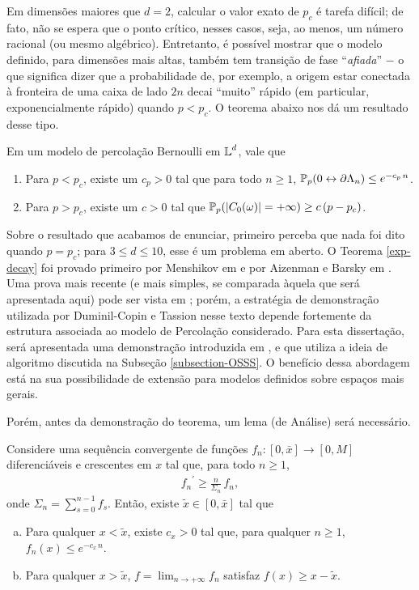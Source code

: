 Em dimensões maiores que $d = 2$, calcular o valor exato de $p_c$ é tarefa difícil; de fato, não se espera que o ponto crítico, nesses casos, seja, ao menos, um número racional (ou mesmo algébrico). Entretanto, é possível mostrar que o modelo definido, para dimensões mais altas, também tem transição de fase ``\textit{afiada}'' $-$ o que significa dizer que a probabilidade de, por exemplo, a origem estar conectada à fronteira de uma caixa de lado $2n$ decai ``muito'' rápido (em particular, exponencialmente rápido) quando $p < p_c$. O teorema abaixo nos dá um resultado desse tipo.

\begin{mythm} \label{exp-decay}
	Em um modelo de percolação Bernoulli em $\operatorname{\mathbb{L}}^d$, vale que
	\begin{enumerate}
		\item Para $p < p_c$, existe um $c_p > 0$ tal que para todo $n \geq 1$, $\operatorname{\mathbb{P}}_p(0 \leftrightarrow \partial\Lambda_n) \leq e^{-c_p\,n}$.
		\item Para $p > p_c$, existe um $c > 0$ tal que $\operatorname{\mathbb{P}}_p(|C_0(\omega)| = +\infty) \geq c\,(p - p_c)$.
	\end{enumerate}
\end{mythm}

Sobre o resultado que acabamos de enunciar, primeiro perceba que nada foi dito quando $p = p_c$; para $3 \leq d \leq 10$, esse é um problema em aberto. O Teorema \ref{exp-decay} foi provado primeiro por Menshikov em \cite{menshikov1986coincidence} e por Aizenman e Barsky em \cite{aizenman1987sharpness}. Uma prova mais recente (e mais simples, se comparada àquela que será apresentada aqui) pode ser vista em \cite{duminil2016newzd}; porém, a estratégia de demonstração utilizada por Duminil-Copin e Tassion nesse texto depende fortemente da estrutura associada ao modelo de Percolação considerado. Para esta dissertação, será apresentada uma demonstração introduzida em \cite{duminil2019sharpdecisiontree}, e que utiliza a ideia de algoritmo discutida na Subseção \ref{subsection-OSSS}. O benefício dessa abordagem está na sua possibilidade de extensão para modelos definidos sobre espaços mais gerais.

Porém, antes da demonstração do teorema, um lema (de Análise) será necessário.

\begin{mylem} \label{lem-seq-funcoes}
	Considere uma sequência convergente de funções $f_n: [0, \bar{x}] \longrightarrow [0, M]$ diferenciáveis e crescentes em $x$ tal que, para todo $n \geq 1$,
	\begin{align} \label{restricao-seq-funcoes}
		{f_n}^{\prime} \geq \frac{n}{\Sigma_n}\,f_n,
	\end{align}
	onde $\Sigma_n = \sum_{s = 0}^{n - 1}f_s$. Então, existe $\tilde{x} \in [0, \bar{x}]$ tal que
	\begin{enumerate}[a.]
		\item Para qualquer $x < \tilde{x}$, existe $c_x > 0$ tal que, para qualquer $n \geq 1$, $f_n(x) \leq e^{-c_x\,n}$.
		\item Para qualquer $x > \tilde{x}$, $f = \lim_{n \rightarrow +\infty} f_n$ satisfaz $f(x) \geq x - \tilde{x}$.
	\end{enumerate}
\end{mylem}


